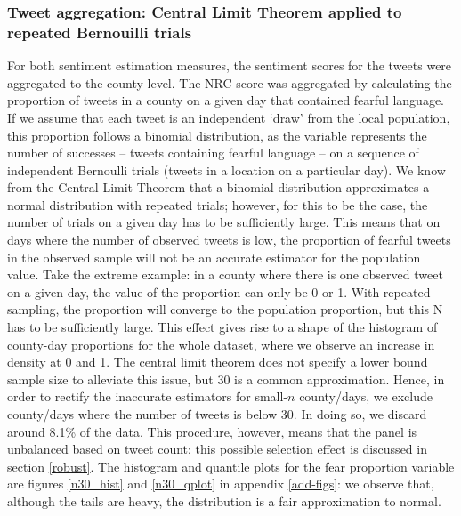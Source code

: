 \documentclass{article}
\begin{document}
\subsubsection{Tweet aggregation: Central Limit Theorem applied to repeated Bernouilli trials}\label{aggregation}
For both sentiment estimation measures, the sentiment scores for the tweets were aggregated to the county level. The NRC score was aggregated by calculating the proportion of tweets in a county on a given day that contained fearful language. If we assume that each tweet is an independent `draw' from the local population, this proportion follows a  binomial distribution, as the variable represents the number of successes -- tweets containing fearful language -- on a sequence of independent Bernoulli trials (tweets in a location on a particular day). We know from the Central Limit Theorem that a binomial distribution approximates a normal distribution with repeated trials; however, for this to be the case, the number of trials on a given day has to be sufficiently large. This means that on days  where the number of observed tweets is low, the proportion of fearful tweets in the observed sample will not be an accurate estimator for the population value. Take the extreme example: in a county where there is one observed tweet on a given day, the value of the proportion can only be 0 or 1. With repeated sampling, the proportion will converge to the population proportion, but this N has to be sufficiently large. This effect gives rise to a shape of the histogram of county-day proportions for the whole dataset, where we observe an increase in density at 0 and 1. The central limit theorem does not specify a lower bound sample size to alleviate this issue, but 30 is a common approximation. Hence, in order to rectify the inaccurate estimators for small-\(n\) county/days, we exclude county/days where the number of tweets is below 30. In doing so, we discard around 8.1\% of the data. This procedure, however, means that the panel is unbalanced based on tweet count; this possible selection effect is discussed in section \ref{robust}. The histogram and quantile plots for the fear proportion variable are figures \ref{n30_hist} and \ref{n30_qplot} in appendix \ref{add-figs}: we observe that, although the tails are heavy, the distribution is a fair approximation to normal.
\end{document}
